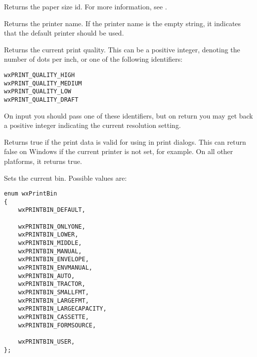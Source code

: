 \label{wxprintdatagetpaperid}


Returns the paper size id. For more information, see .


\label{wxprintdatagetprintername}


Returns the printer name. If the printer name is the empty string, it indicates that the default
printer should be used.


\label{wxprintdatagetquality}


Returns the current print quality. This can be a positive integer, denoting the number of dots per inch, or
one of the following identifiers:

\begin{verbatim}
wxPRINT_QUALITY_HIGH
wxPRINT_QUALITY_MEDIUM
wxPRINT_QUALITY_LOW
wxPRINT_QUALITY_DRAFT
\end{verbatim}

On input you should pass one of these identifiers, but on return you may get back a positive integer
indicating the current resolution setting.


\label{wxprintdataok}


Returns true if the print data is valid for using in print dialogs.
This can return false on Windows if the current printer is not set, for example.
On all other platforms, it returns true.


\label{wxprintdatasetbin}


Sets the current bin. Possible values are:

\small{
\begin{verbatim}
enum wxPrintBin
{
    wxPRINTBIN_DEFAULT,

    wxPRINTBIN_ONLYONE,
    wxPRINTBIN_LOWER,
    wxPRINTBIN_MIDDLE,
    wxPRINTBIN_MANUAL,
    wxPRINTBIN_ENVELOPE,
    wxPRINTBIN_ENVMANUAL,
    wxPRINTBIN_AUTO,
    wxPRINTBIN_TRACTOR,
    wxPRINTBIN_SMALLFMT,
    wxPRINTBIN_LARGEFMT,
    wxPRINTBIN_LARGECAPACITY,
    wxPRINTBIN_CASSETTE,
    wxPRINTBIN_FORMSOURCE,

    wxPRINTBIN_USER,
};
\end{verbatim}
}


